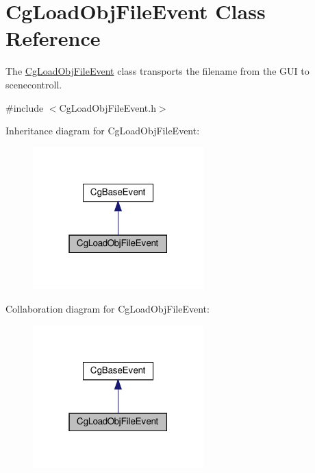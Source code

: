 \hypertarget{class_cg_load_obj_file_event}{}\section{Cg\+Load\+Obj\+File\+Event Class Reference}
\label{class_cg_load_obj_file_event}


The \hyperlink{class_cg_load_obj_file_event}{Cg\+Load\+Obj\+File\+Event} class transports the filename from the G\+UI to scenecontroll.  




{\ttfamily \#include $<$Cg\+Load\+Obj\+File\+Event.\+h$>$}



Inheritance diagram for Cg\+Load\+Obj\+File\+Event\+:
\nopagebreak
\begin{figure}[H]
\begin{center}
\leavevmode
\includegraphics[width=187pt]{class_cg_load_obj_file_event__inherit__graph}
\end{center}
\end{figure}


Collaboration diagram for Cg\+Load\+Obj\+File\+Event\+:
\nopagebreak
\begin{figure}[H]
\begin{center}
\leavevmode
\includegraphics[width=187pt]{class_cg_load_obj_file_event__coll__graph}
\end{center}
\end{figure}
